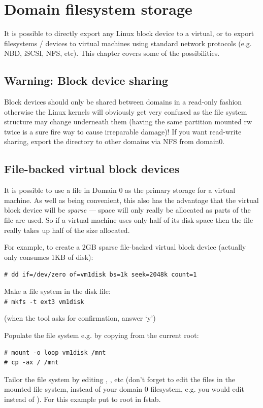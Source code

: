 \documentclass[11pt,twoside,final,openright]{xenstyle}
\begin{document}
\chapter{Domain filesystem storage}

It is possible to directly export any Linux block device to a virtual,
or to export filesystems / devices to virtual machines using standard
network protocols (e.g. NBD, iSCSI, NFS, etc).  This chapter covers
some of the possibilities.

\section{Warning: Block device sharing}

Block devices should only be shared between domains in a read-only
fashion otherwise the Linux kernels will obviously get very confused
as the file system structure may change underneath them (having the
same partition mounted rw twice is a sure fire way to cause
irreparable damage)!  If you want read-write sharing, export the
directory to other domains via NFS from domain0.

\section{File-backed virtual block devices}

It is possible to use a file in Domain 0 as the primary storage for a
virtual machine.  As well as being convenient, this also has the
advantage that the virtual block device will be {\em sparse} --- space
will only really be allocated as parts of the file are used.  So if a
virtual machine uses only half of its disk space then the file really
takes up half of the size allocated.

For example, to create a 2GB sparse file-backed virtual block device
(actually only consumes 1KB of disk):

\verb_# dd if=/dev/zero of=vm1disk bs=1k seek=2048k count=1_

Make a file system in the disk file: \\
\verb_# mkfs -t ext3 vm1disk_

(when the tool asks for confirmation, answer `y')

Populate the file system e.g. by copying from the current root:
\begin{verbatim}
# mount -o loop vm1disk /mnt
# cp -ax / /mnt
\end{verbatim}
Tailor the file system by editing ,
, etc (don't forget to edit the files in the
mounted file system, instead of your domain 0 filesystem, e.g. you
would edit  instead of  ).  For
this example put  to root in fstab.
\end{document}
